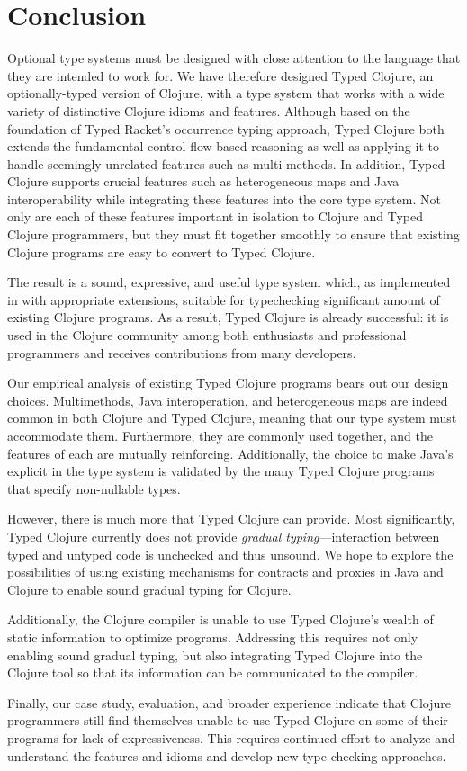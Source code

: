 \section{Conclusion}
\label{sec:conclusion}

Optional type systems must be designed with close attention to the
language that they are intended to work for.
We have therefore designed Typed Clojure, an optionally-typed version of
Clojure, with a type system that works with a wide variety of distinctive
Clojure idioms and features. Although based on the foundation of Typed
Racket's occurrence typing approach, Typed Clojure both extends the
fundamental control-flow based reasoning as well as applying it to
handle seemingly unrelated features such as multi-methods. In
addition, Typed Clojure supports crucial features such as
heterogeneous maps and Java interoperability while integrating these
features into the core type system. Not only are each of these
features important in isolation to Clojure and Typed Clojure
programmers, but they must fit together smoothly to ensure that
existing Clojure programs are easy to convert to Typed Clojure.

The result is a sound, expressive, and useful type system which, as
implemented in \coretyped with appropriate extensions, suitable for
typechecking significant amount of existing Clojure programs.
%
As a result, Typed Clojure is already successful: it is used in
the Clojure community among both enthusiasts and professional
programmers and receives contributions from many developers.

Our empirical analysis of existing Typed Clojure programs bears out
our design choices. Multimethods, Java interoperation, and
heterogeneous maps are indeed common in both Clojure and Typed Clojure,
meaning that our type system must accommodate them. Furthermore, they
are commonly used together, and the features of each are mutually
reinforcing. Additionally, the choice to make Java's 
explicit in the type system is validated by the many Typed Clojure
programs that  specify non-nullable types.



However, there is much more that Typed Clojure can provide. Most
significantly, Typed Clojure currently does not provide \emph{gradual
  typing}---interaction between typed and untyped code is unchecked and
thus unsound. We hope to explore the possibilities of using existing
mechanisms for contracts and proxies in Java and
Clojure to enable sound gradual typing for Clojure.

Additionally, the Clojure compiler is unable to use Typed Clojure's
wealth of static information to optimize programs. Addressing this
requires not only  enabling sound gradual typing, but also
integrating Typed Clojure into the Clojure tool so
that its information can be communicated to the compiler. 

Finally, our case study, evaluation, and broader experience indicate that Clojure
programmers still find themselves unable to use Typed Clojure on some
of their programs for lack of expressiveness. This requires continued
effort to analyze and understand the features and idioms and
develop new type checking approaches.

